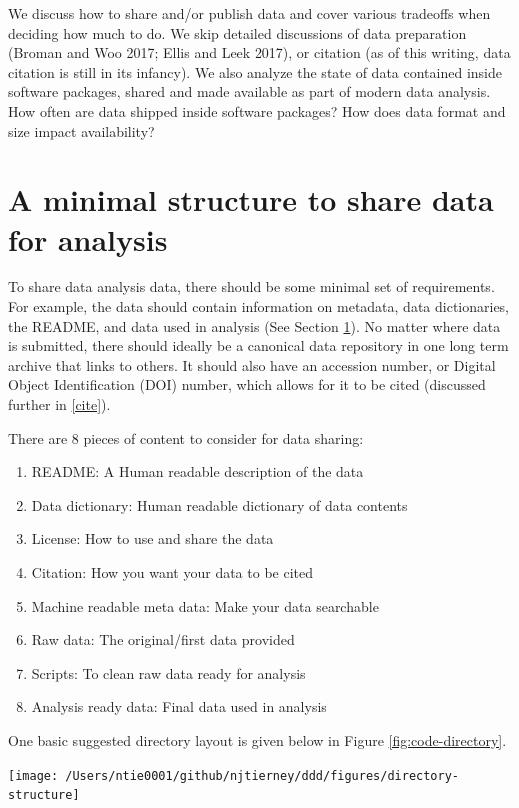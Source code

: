 \documentclass[
]{article}
\providecommand{\tightlist}{%
  \setlength{\itemsep}{0pt}\setlength{\parskip}{0pt}}
\let\origfigure\figure
\let\endorigfigure\endfigure
\renewenvironment{figure}[1][2] {
    \expandafter\origfigure\expandafter[H]
} {
    \endorigfigure
}
\begin{document}
We discuss how to share and/or publish data and cover various tradeoffs when deciding how much to do. We skip detailed discussions of data preparation (Broman and Woo 2017; Ellis and Leek 2017), or citation (as of this writing, data citation is still in its infancy). We also analyze the state of data contained inside software packages, shared and made available as part of modern data analysis. How often are data shipped inside software packages? How does data format and size impact availability?

\hypertarget{minimal}{%
\section{A minimal structure to share data for analysis}\label{minimal}}

To share data analysis data, there should be some minimal set of requirements. For example, the data should contain information on metadata, data dictionaries, the README, and data used in analysis (See Section \ref{minimal}). No matter where data is submitted, there should ideally be a canonical data repository in one long term archive that links to others. It should also have an accession number, or Digital Object Identification (DOI) number, which allows for it to be cited (discussed further in \ref{cite}).

There are 8 pieces of content to consider for data sharing:

\begin{enumerate}
\def\labelenumi{\arabic{enumi}.}
\tightlist
\item
  README: A Human readable description of the data
\item
  Data dictionary: Human readable dictionary of data contents
\item
  License: How to use and share the data
\item
  Citation: How you want your data to be cited
\item
  Machine readable meta data: Make your data searchable
\item
  Raw data: The original/first data provided
\item
  Scripts: To clean raw data ready for analysis
\item
  Analysis ready data: Final data used in analysis
\end{enumerate}

One basic suggested directory layout is given below in Figure \ref{fig:code-directory}.

\begin{figure}

{\centering \texttt{[image: /Users/ntie0001/github/njtierney/ddd/figures/directory-structure]} 

}

\caption{Example directory layout and structure for a data repository.}\label{fig:code-directory}
\end{figure}
\end{document}
